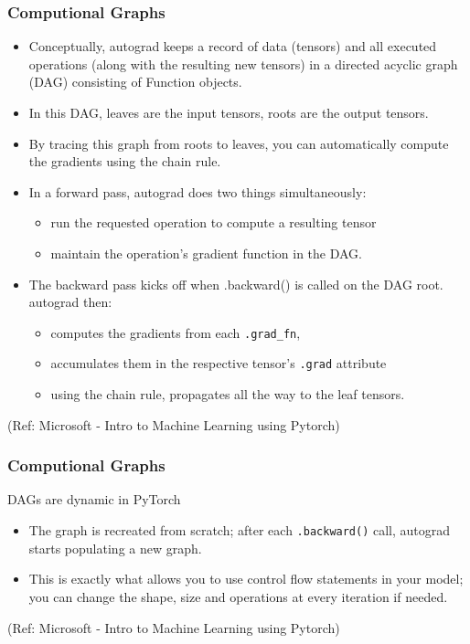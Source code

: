 \begin{frame}[fragile] \frametitle{Computional Graphs}


\begin{itemize}
\item Conceptually, autograd keeps a record of data (tensors) and all executed operations (along with the resulting new tensors) in a directed acyclic graph (DAG) consisting of Function objects. 
\item In this DAG, leaves are the input tensors, roots are the output tensors. 
\item By tracing this graph from roots to leaves, you can automatically compute the gradients using the chain rule.
\item In a forward pass, autograd does two things simultaneously:
	\begin{itemize}
	\item run the requested operation to compute a resulting tensor
	\item maintain the operation’s gradient function in the DAG.
	\end{itemize}
\item The backward pass kicks off when .backward() is called on the DAG root. autograd then:
	\begin{itemize}
	\item computes the gradients from each \lstinline|.grad_fn|,
	\item accumulates them in the respective tensor’s \lstinline|.grad| attribute
	\item using the chain rule, propagates all the way to the leaf tensors.
	\end{itemize}

\end{itemize}


\tiny{(Ref: Microsoft - Intro to Machine Learning using Pytorch)}
\end{frame}

\begin{frame}[fragile] \frametitle{Computional Graphs}
DAGs are dynamic in PyTorch

\begin{itemize}
\item The graph is recreated from scratch; after each \lstinline|.backward()| call, autograd starts populating a new graph. 
\item This is exactly what allows you to use control flow statements in your model; you can change the shape, size and operations at every iteration if needed.
\end{itemize}


\tiny{(Ref: Microsoft - Intro to Machine Learning using Pytorch)}
\end{frame}

